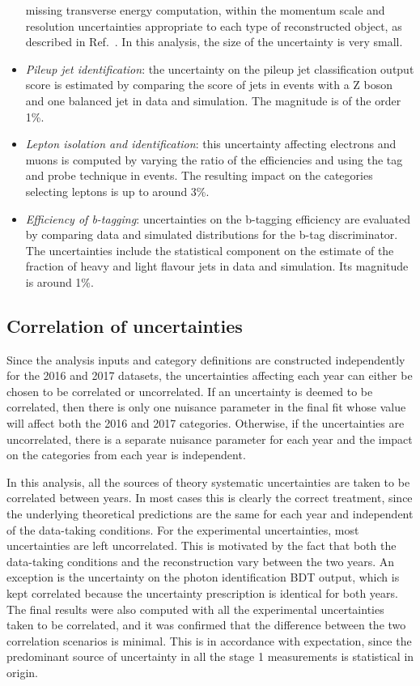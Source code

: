 \begin{itemize}
  missing transverse energy computation, 
  within the momentum scale and resolution uncertainties appropriate 
  to each type of reconstructed object,
  as described in Ref.~\cite{JetsInRun2}.
  In this analysis, the size of the uncertainty is very small.
\item \textit{Pileup jet identification}: 
  the uncertainty on the pileup jet classification output score is estimated by
  comparing the score of jets in events with a Z boson and one balanced jet
  in data and simulation. 
  The magnitude is of the order 1\%.
\item \textit{Lepton isolation and identification}: 
  this uncertainty affecting electrons and muons
  is computed by varying the ratio of the efficiencies and
  using the tag and probe technique in \Zee events. 
  The resulting impact on the categories selecting leptons is up to around 3\%.
\item \textit{Efficiency of b-tagging}: 
  uncertainties on the b-tagging efficiency are evaluated 
  by comparing data and simulated distributions for the b-tag
  discriminator.
  The uncertainties include the statistical component on the
  estimate of the fraction of heavy and
  light flavour jets in data and simulation.
  Its magnitude is around 1\%.
\end{itemize}

\subsection{Correlation of uncertainties}

Since the analysis inputs and category definitions are constructed independently 
for the 2016 and 2017 datasets, %
the uncertainties affecting each year can either be chosen to be correlated or uncorrelated.
If an uncertainty is deemed to be correlated, 
then there is only one nuisance parameter in the final fit 
whose value will affect both the 2016 and 2017 categories.
Otherwise, if the uncertainties are uncorrelated, there is a separate nuisance parameter for each year 
and the impact on the categories from each year is independent.

In this analysis, 
all the sources of theory systematic uncertainties are taken to be correlated between years.
In most cases this is clearly the correct treatment, %
since the underlying theoretical predictions are the same for each year 
and independent of the data-taking conditions.
For the experimental uncertainties,
most uncertainties are left uncorrelated.
This is motivated by the fact that both the data-taking conditions 
and the reconstruction vary between the two years.
An exception is the uncertainty on the photon identification BDT output, 
which is kept correlated because the uncertainty prescription is identical for both years.
The final results were also computed with all the experimental uncertainties taken to be correlated, 
and it was confirmed that the difference between the two correlation scenarios is minimal.
This is in accordance with expectation, since the predominant source of uncertainty 
in all the stage 1 measurements is statistical in origin.

